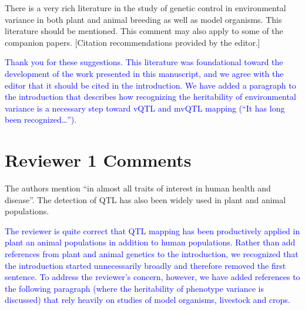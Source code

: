 \documentclass[11pt]{article}
\newcommand{\ReviewerQuestion}[1]{
  \vspace{5pt}\goodbreak
  \noindent\fbox{Reviewer:} #1
  \normalfont\par
}
\newcommand{\EditorQuestion}[1]{
  \vspace{5pt}\goodbreak
  \noindent\fbox{Editor:} #1
  \normalfont\par
}
\newcommand{\Response}[1]{
  \goodbreak
  \textcolor{blue}{#1}
  \normalfont\par
}
\begin{document}
\EditorQuestion{
  There is a very rich literature in the study of genetic control in environmental variance in both plant and animal breeding as well as model organisms.
  This literature should be mentioned. This comment may also apply to some of the companion papers.
  [Citation recommendations provided by the editor.]
}
\Response{
  Thank you for these suggestions. 
  This literature was foundational toward the development of the work presented in this manuscript, and we agree with the editor that it should be cited in the introduction.
  We have added a paragraph to the introduction that describes how recognizing the heritability of environmental variance is a necessary step toward vQTL and mvQTL mapping (``It has long been recognized\dots'').
}







\section*{Reviewer 1 Comments}

\ReviewerQuestion{
  The authors mention ``in almost all traits of interest in human health and disease''.
  The detection of QTL has also been widely used in plant and animal populations.
}
\Response{
  The reviewer is quite correct that QTL mapping has been productively applied in plant an animal populations in addition to human populations.
  Rather than add references from plant and animal genetics to the introduction, we recognized that the introduction started unnecessarily broadly and therefore removed the first sentence.
  To address the reviewer's concern, however, we have added references to the following paragraph (where the heritability of phenotype variance is discussed) that rely heavily on studies of model organisms, livestock and crops.
}
\end{document}
